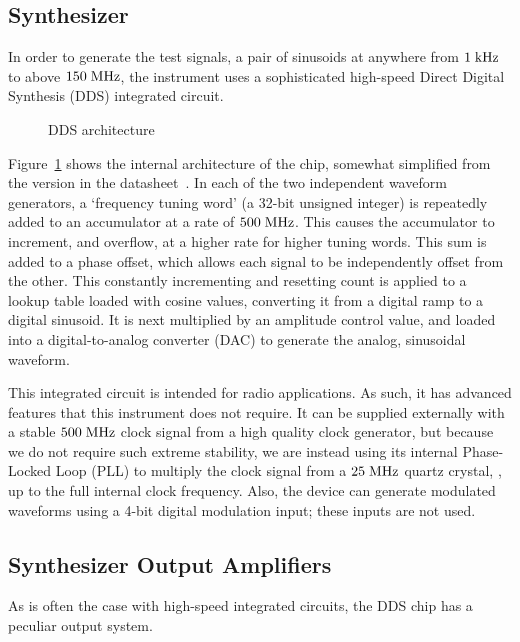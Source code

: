 \subsection{Synthesizer}


In order to generate the test signals, a pair of sinusoids at anywhere from
$1\;\mathrm{kHz}$ to above $150\;\mathrm{MHz}$, the instrument uses a sophisticated
high-speed Direct Digital Synthesis (DDS) integrated circuit.

\begin{figure}[H]
\centering
{}
\caption{DDS architecture}
\label{fig:dds}
\end{figure}

Figure~\ref{fig:dds} shows the internal architecture of the chip, somewhat
simplified from the version in the datasheet~\cite{ad9958}. In each of the two
independent waveform generators, a `frequency tuning word' (a 32-bit unsigned
integer) is repeatedly added to an accumulator at a rate of $500\;\mathrm{MHz}$.
This causes the accumulator to increment, and overflow, at a higher rate for
higher tuning words. This sum is added to a phase offset, which allows each
signal to be independently offset from the other. This constantly incrementing
and resetting count is applied to a lookup table loaded with cosine values,
converting it from a digital ramp to a digital sinusoid. It is next multiplied
by an amplitude control value, and loaded into a digital-to-analog converter
(DAC) to generate the analog, sinusoidal waveform.

This integrated circuit is intended for radio applications. As such, it has
advanced features that this instrument does not require. It can be supplied
externally with a stable $500\;\mathrm{MHz}$ clock signal from a high quality
clock generator, but because we do not require such extreme stability, we
are instead using its internal Phase-Locked Loop (PLL) to multiply the clock
signal from a $25\;\mathrm{MHz}$ quartz crystal, , up to the full
internal clock frequency. Also, the device can generate modulated waveforms
using a 4-bit digital modulation input; these inputs are not used.

\subsection{Synthesizer Output Amplifiers}

As is often the case with high-speed integrated circuits, the DDS chip has a
peculiar output system.

